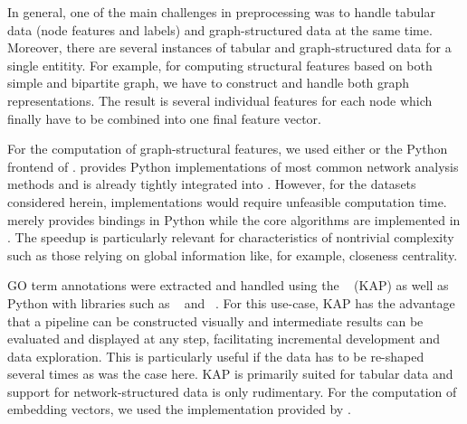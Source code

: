 \documentclass[
	fontsize=10pt, %
	twoside=true, %
	secnumdepth=1, %
  toc=indentunnumbered %
]{kaobook}
\begin{document}
In general, one of the main challenges in preprocessing was to handle tabular
data (node features and labels) and graph-structured data at the same time.
Moreover, there are several instances of tabular and graph-structured data for a
single entitity. For example, for computing structural features based on both
simple and bipartite graph, we have to construct and handle both graph
representations. The result is several individual features for each node which
finally have to be combined into one final feature vector.

For the computation of graph-structural features, we used either
 \cite{hagberg_ExploringNetworkStructure_2008} or the Python
frontend of  \cite{csardi_IgraphSoftwarePackage_}.
 provides Python implementations of most common network
analysis methods and is already tightly integrated into .
However, for the datasets considered herein,  implementations
would require unfeasible computation time.  merely provides
bindings in Python while the core algorithms are implemented in . The
speedup is particularly relevant for characteristics of nontrivial complexity
such as those relying on global information like, for example, closeness
centrality.

GO term annotations were extracted and handled using the ~\cite{gesellschaftfurklassifikation_DataAnalysisMachine_2008} (KAP)
as well as Python with libraries such as
~\cite{reback_PandasdevPandasPandas_2021} and
~\cite{harris_ArrayProgrammingNumPy_2020}. For this use-case,
KAP has the advantage that a pipeline can be constructed visually and
intermediate results can be evaluated and displayed at any step, facilitating
incremental development and data exploration. This is particularly useful if the
data has to be re-shaped several times as was the case here. KAP is primarily
suited for tabular data and support for network-structured data is only
rudimentary. For the computation of embedding vectors, we used the
 implementation provided by . 
\end{document}
